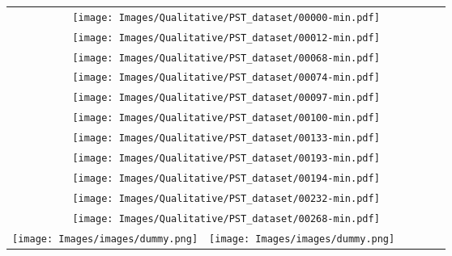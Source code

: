 \documentclass[10pt,twocolumn,letterpaper]{article}
\begin{document}
\begin{figure*}[t]
\begin{center}
{
\begin{tabular}{c@{\hskip 0.005\linewidth}c@{\hskip 0.005\linewidth}c@{\hskip 0.005\linewidth}c@{\hskip 0.005\linewidth}c@{\hskip 0.005\linewidth}c}
\multicolumn{6}{c}{\texttt{[image: Images/Qualitative/PST\_dataset/00000-min.pdf]}} \vspace{-0.02in} \\
\multicolumn{6}{c}{\texttt{[image: Images/Qualitative/PST\_dataset/00012-min.pdf]}} \vspace{-0.02in} \\
\multicolumn{6}{c}{\texttt{[image: Images/Qualitative/PST\_dataset/00068-min.pdf]}} \vspace{-0.02in} \\
\multicolumn{6}{c}{\texttt{[image: Images/Qualitative/PST\_dataset/00074-min.pdf]}} \vspace{-0.02in} \\
\multicolumn{6}{c}{\texttt{[image: Images/Qualitative/PST\_dataset/00097-min.pdf]}} \vspace{-0.02in} \\
\multicolumn{6}{c}{\texttt{[image: Images/Qualitative/PST\_dataset/00100-min.pdf]}} \vspace{-0.02in} \\
\multicolumn{6}{c}{\texttt{[image: Images/Qualitative/PST\_dataset/00133-min.pdf]}} \vspace{-0.02in} \\
\multicolumn{6}{c}{\texttt{[image: Images/Qualitative/PST\_dataset/00193-min.pdf]}} \vspace{-0.02in} \\
\multicolumn{6}{c}{\texttt{[image: Images/Qualitative/PST\_dataset/00194-min.pdf]}} \vspace{-0.02in} \\
\multicolumn{6}{c}{\texttt{[image: Images/Qualitative/PST\_dataset/00232-min.pdf]}} \vspace{-0.02in} \\
\multicolumn{6}{c}{\texttt{[image: Images/Qualitative/PST\_dataset/00268-min.pdf]}} \vspace{-0.02in} \\
\texttt{[image: Images/images/dummy.png]} & \texttt{[image: Images/images/dummy.png]} & 

\end{tabular}}
\end{center}
\end{figure*}
\end{document}
